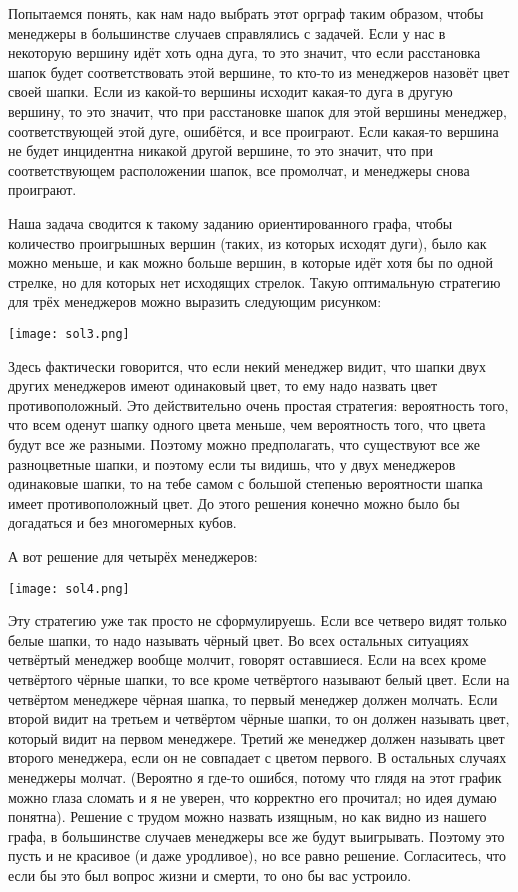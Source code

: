 Попытаемся понять, как нам надо выбрать этот орграф таким образом, чтобы менеджеры в большинстве случаев справлялись с задачей. Если у нас в некоторую вершину идёт хоть одна дуга, то это значит, что если расстановка шапок будет соответствовать этой вершине, то кто-то из менеджеров назовёт цвет своей шапки. Если из какой-то вершины исходит какая-то дуга в другую вершину, то это значит, что при расстановке шапок для этой вершины менеджер, соответствующей этой дуге, ошибётся, и все проиграют. Если какая-то вершина не будет инцидентна никакой другой вершине, то это значит, что при соответствующем расположении шапок, все промолчат, и менеджеры снова проиграют.

Наша задача сводится к такому заданию ориентированного графа, чтобы количество проигрышных вершин (таких, из которых исходят дуги), было как можно меньше, и как можно больше вершин, в которые идёт хотя бы по одной стрелке, но для которых нет исходящих стрелок. Такую оптимальную стратегию для трёх менеджеров можно выразить следующим рисунком:

\texttt{[image: sol3.png]}

Здесь фактически говорится, что если некий менеджер видит, что шапки двух других менеджеров имеют одинаковый цвет, то ему надо назвать цвет противоположный. Это действительно очень простая стратегия: вероятность того, что всем оденут шапку одного цвета меньше, чем вероятность того, что цвета будут все же разными. Поэтому можно предполагать, что существуют все же разноцветные шапки, и поэтому если ты видишь, что у двух менеджеров одинаковые шапки, то на тебе самом с большой степенью вероятности шапка имеет противоположный цвет. До этого решения конечно можно было бы догадаться и без многомерных кубов.

А вот решение для четырёх менеджеров:

\texttt{[image: sol4.png]}

Эту стратегию уже так просто не сформулируешь. Если все четверо видят только белые шапки, то надо называть чёрный цвет. Во всех остальных ситуациях четвёртый менеджер вообще молчит, говорят оставшиеся. Если на всех кроме четвёртого чёрные шапки, то все кроме четвёртого называют белый цвет. Если на четвёртом менеджере чёрная шапка, то первый менеджер должен молчать. Если второй видит на третьем и четвёртом чёрные шапки, то он должен называть цвет, который видит на первом менеджере. Третий же менеджер должен называть цвет второго менеджера, если он не совпадает с цветом первого. В остальных случаях менеджеры молчат. (Вероятно я где-то ошибся, потому что глядя на этот график можно глаза сломать и я не уверен, что корректно его прочитал; но идея думаю понятна). Решение с трудом можно назвать изящным, но как видно из нашего графа, в большинстве случаев менеджеры все же будут выигрывать. Поэтому это пусть и не красивое (и даже уродливое), но все равно решение. Согласитесь, что если бы это был вопрос жизни и смерти, то оно бы вас устроило.

